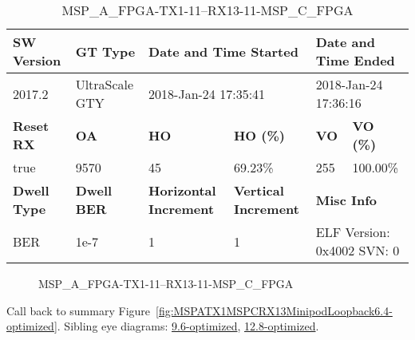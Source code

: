 \begin{table}[h]
\centering
\caption{MSP\_A\_FPGA-TX1-11--RX13-11-MSP\_C\_FPGA}
\label{tab:MSPAFPGATX111RX1311MSPCFPGA6.4-optimized}
\begin{tabular}{@{}|l|l|l|l|l|l|@{}}
\toprule
\textbf{SW Version}                & \textbf{GT Type}   & \multicolumn{2}{l|}{\textbf{Date and Time Started}}            & \multicolumn{2}{l|}{\textbf{Date and Time Ended}}        \\ \midrule
2017.2                       & UltraScale GTY          & \multicolumn{2}{l|}{2018-Jan-24 17:35:41}                   & \multicolumn{2}{l|}{2018-Jan-24 17:36:16}               \\ \midrule
\textbf{Reset RX}                  & \textbf{OA} & \textbf{HO}   & \textbf{HO (\%)} & \textbf{VO} & \textbf{VO (\%)} \\ \midrule
true & 9570        & 45          & 69.23\%        & 255        & 100.00\%       \\ \midrule
\textbf{Dwell Type}                & \textbf{Dwell BER} & \textbf{Horizontal Increment} & \textbf{Vertical Increment}    & \multicolumn{2}{l|}{\textbf{Misc Info}}                  \\ \midrule
BER                            & 1e-7        & 1        & 1           & \multicolumn{2}{l|}{ELF Version: 0x4002 SVN: 0}                         \\ \bottomrule
\end{tabular}
\end{table}

\begin{figure}[h]
\caption{MSP\_A\_FPGA-TX1-11--RX13-11-MSP\_C\_FPGA} \label{fig:MSPAFPGATX111RX1311MSPCFPGA6.4-optimized}
\end{figure}

Call back to summary Figure~\ref{fig:MSPATX1MSPCRX13MinipodLoopback6.4-optimized}.
Sibling eye diagrams: \hyperref[sec:MSPAFPGATX111RX1311MSPCFPGA9.6-optimized]{9.6-optimized}, \hyperref[sec:MSPAFPGATX111RX1311MSPCFPGA12.8-optimized]{12.8-optimized}.

\clearpage
\newpage

